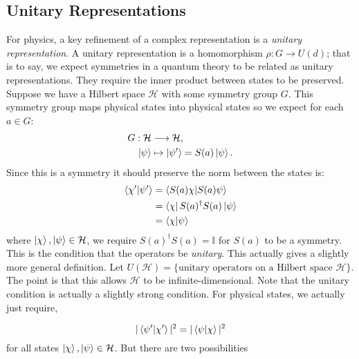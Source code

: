 \begin{enumerate}
\subsection{Unitary Representations}
For physics, a key refinement of a complex representation is a \textit{unitary representation}. A unitary representation is a homomorphism $\rho: G\rightarrow U(d)$; that is to say, we expect symmetries in a quantum theory to be related as unitary representations. They require the inner product between states to be preserved. Suppose we have a Hilbert space $\mathcal{H}$ with some symmetry group $G$. This symmetry group maps physical states into physical states so we expect for each $a\in G$: 
\begin{equation}
\begin{split}
    G:\mathcal{H}&\longrightarrow \mathcal{H},\\
    \ket{\psi}&\mapsto \ket{\psi'} = S(a)\ket{\psi}.
\end{split}
\end{equation}
Since this is a symmetry it should preserve the norm between the states is: 
\begin{equation}
    \begin{split}
        \braket{\chi'|\psi'} &= \braket{S(a)\chi|S(a)\psi}\\
        &=\bra{\chi}S(a)^{\dagger}S(a)\ket{\psi}\\
        &=\braket{\chi|\psi}
    \end{split}
\end{equation}
where $\ket{\chi},\ket{\psi}\in\mathcal{H}$, we require $S(a)^{\dagger}S(a) = \mathbb{I}$ for $S(a)$ to be a symmetry. This is the condition that the operators be \textit{unitary}. This actually gives a slightly more general definition. Let $U(\mathcal{H}) = \{\text{unitary operators on a Hilbert space } \mathcal{H}\}$. The point is that this allows $\mathcal{H}$ to be infinite-dimensional. Note that the unitary condition is actually a slightly strong condition. For physical states, we actually just require, 

\begin{equation}
    |\braket{\psi'|\chi'}|^2 = |\braket{\psi|\chi}|^2 
\end{equation}
for all states $\ket{\chi}, \ket{\psi}\in \mathcal{H}$. But there are two possibilities 


\end{enumerate}
